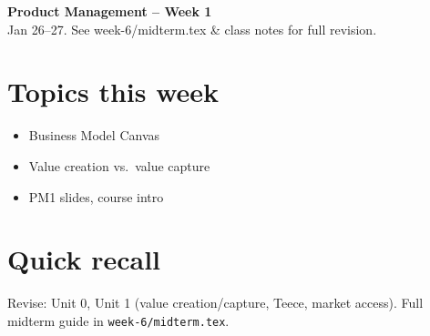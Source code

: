 \documentclass[10pt,a4paper]{article}
\begin{document}
\begin{center}
{\large\bfseries\color{eublue} Product Management -- Week 1}\\[0.2em]
\footnotesize Jan 26--27. See week-6/midterm.tex \& class notes for full revision.
\end{center}\vspace{0.5em}

\section*{\color{eublue}Topics this week}
\begin{itemize}
\item Business Model Canvas
\item Value creation vs.\ value capture
\item PM1 slides, course intro
\end{itemize}

\section*{Quick recall}
Revise: Unit 0, Unit 1 (value creation/capture, Teece, market access). Full midterm guide in \texttt{week-6/midterm.tex}.
\end{document}
